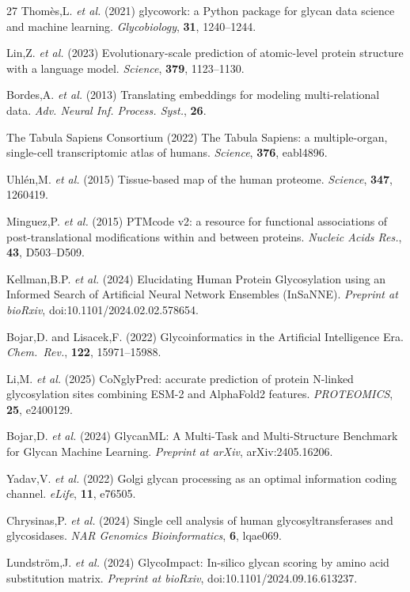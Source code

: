 \documentclass[11pt,a4paper]{article}
\begin{document}
\begin{thebibliography}{27}
Thom\`es,L. \textit{et al.} (2021) glycowork: a Python package for glycan data science and machine learning. \textit{Glycobiology}, \textbf{31}, 1240--1244.

Lin,Z. \textit{et al.} (2023) Evolutionary-scale prediction of atomic-level protein structure with a language model. \textit{Science}, \textbf{379}, 1123--1130.

Bordes,A. \textit{et al.} (2013) Translating embeddings for modeling multi-relational data. \textit{Adv. Neural Inf. Process. Syst.}, \textbf{26}.

The Tabula Sapiens Consortium (2022) The Tabula Sapiens: a multiple-organ, single-cell transcriptomic atlas of humans. \textit{Science}, \textbf{376}, eabl4896.

Uhl\'en,M. \textit{et al.} (2015) Tissue-based map of the human proteome. \textit{Science}, \textbf{347}, 1260419.

Minguez,P. \textit{et al.} (2015) PTMcode v2: a resource for functional associations of post-translational modifications within and between proteins. \textit{Nucleic Acids Res.}, \textbf{43}, D503--D509.

Kellman,B.P. \textit{et al.} (2024) Elucidating Human Protein Glycosylation using an Informed Search of Artificial Neural Network Ensembles (InSaNNE). \textit{Preprint at bioRxiv}, doi:10.1101/2024.02.02.578654.

Bojar,D. and Lisacek,F. (2022) Glycoinformatics in the Artificial Intelligence Era. \textit{Chem.\ Rev.}, \textbf{122}, 15971--15988.

Li,M. \textit{et al.} (2025) CoNglyPred: accurate prediction of protein N-linked glycosylation sites combining ESM-2 and AlphaFold2 features. \textit{PROTEOMICS}, \textbf{25}, e2400129.

Bojar,D. \textit{et al.} (2024) GlycanML: A Multi-Task and Multi-Structure Benchmark for Glycan Machine Learning. \textit{Preprint at arXiv}, arXiv:2405.16206.

Yadav,V. \textit{et al.} (2022) Golgi glycan processing as an optimal information coding channel. \textit{eLife}, \textbf{11}, e76505.

Chrysinas,P. \textit{et al.} (2024) Single cell analysis of human glycosyltransferases and glycosidases. \textit{NAR Genomics Bioinformatics}, \textbf{6}, lqae069.

Lundstr\"om,J. \textit{et al.} (2024) GlycoImpact: In-silico glycan scoring by amino acid substitution matrix. \textit{Preprint at bioRxiv}, doi:10.1101/2024.09.16.613237.

\end{thebibliography}
\end{document}
